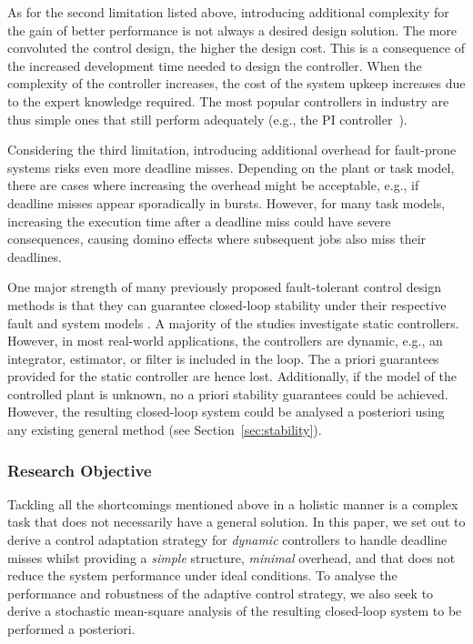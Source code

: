 As for the second limitation listed above, introducing additional complexity for the gain of better performance is not always a desired design solution. 
The more convoluted the control design, the higher the design cost. 
This is a consequence of the increased development time needed to design the controller.
When the complexity of the controller increases, the cost of the system upkeep increases due to the expert knowledge required. 
The most popular controllers in industry are thus simple ones that still perform adequately (e.g., the PI controller~\cite{Sun:2016, Desborough:2002, Astrom:1984}).

Considering the third limitation, introducing additional overhead for fault-prone systems risks even more deadline misses. 
Depending on the plant or task model, there are cases where increasing the overhead might be acceptable, e.g., if deadline misses appear sporadically in bursts. 
However, for many task models, increasing the execution time after a deadline miss could have severe consequences, causing domino effects where subsequent jobs also miss their deadlines.

One major strength of many previously proposed fault-tolerant control design methods is that they can guarantee closed-loop stability under their respective fault and system models \cite{Schinkel:2006,Chakraborty:2012,Linsenmayer:2017,Linsenmayer:2020}. 
A majority of the studies investigate static controllers. 
However, in most real-world applications, the controllers are dynamic, e.g., an integrator, estimator, or filter is included in the loop.
The a priori guarantees provided for the static controller are hence lost.
Additionally, if the model of the controlled plant is unknown, no a priori stability guarantees could be achieved.
However, the resulting closed-loop system could be analysed a posteriori using any existing general method (see Section~\ref{sec:stability}).

\subsubsection*{Research Objective}
Tackling all the shortcomings mentioned above in a holistic manner is a complex task that does not necessarily have a general solution.
In this paper, we set out to derive a control adaptation strategy for \emph{dynamic} controllers to handle deadline misses whilst providing a \emph{simple} structure, \emph{minimal} overhead, and that does not reduce the system performance under ideal conditions.
To analyse the performance and robustness of the adaptive control strategy, we also seek to derive a stochastic mean-square analysis of the resulting closed-loop system to be performed a posteriori.
